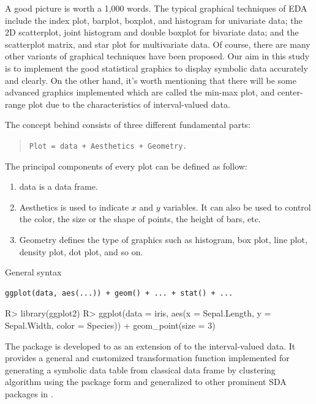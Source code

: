 \documentclass[article]{jss}
\begin{document}
A good picture is worth a 1,000 words. The typical graphical
techniques of EDA include the index plot, barplot, boxplot, and
histogram for univariate data; the 2D scatterplot, joint histogram and
double boxplot for bivariate data; and the scatterplot matrix, and star
plot for multivariate data. Of course, there are many other variants
of graphical techniques have been proposed. Our aim in this study is
to implement the good statistical graphics to display symbolic data
accurately and clearly. On the other hand, it's worth mentioning that
there will be some advanced graphics implemented which are called the
min-max plot, and center-range plot due to the characteristics of
interval-valued data. 


The concept behind  consists of three different fundamental parts: 
\begin{quote}
{\tt Plot = data + Aesthetics + Geometry.}
\end{quote}
The principal components of every plot can be defined as follow:
\begin{enumerate}
\item data is a data frame.
\item Aesthetics is used to indicate $x$ and $y$ variables. It can also be used to control the color, the size or the shape of points, the height of bars, etc.
\item Geometry defines the type of graphics such as histogram, box plot, line plot, density plot, dot plot, and so on.
\end{enumerate}

General  syntax
\begin{verbatim}
ggplot(data, aes(...)) + geom() + ... + stat() + ...
\end{verbatim}

\begin{CodeChunk}
\begin{CodeInput}
R> library(ggplot2)
R> ggplot(data = iris, aes(x = Sepal.Length, y = Sepal.Width, color = Species)) +
         geom_point(size = 3)
\end{CodeInput}
\end{CodeChunk}

The package  is developed to as an extension of  to the interval-valued data. 
It provides a general and customized
transformation function  implemented for generating
a symbolic data table from classical data frame by clustering
algorithm using the  package \cite{RSDA} form and
generalized  to other prominent SDA packages in
.
\end{document}
